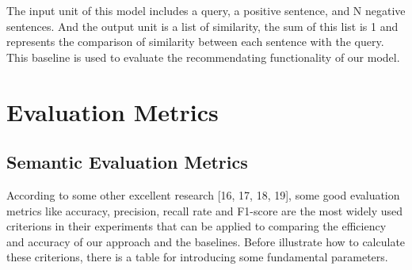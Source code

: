 The input unit of this model includes a query, a positive sentence, and N negative sentences. And the output unit is a list of similarity, the sum of this list is 1 and represents the comparison of similarity between each sentence with the query. This baseline is used to evaluate the recommendating functionality of our model.

	
	\section{Evaluation Metrics}
	
	\subsection{Semantic Evaluation Metrics}
	According to some other excellent research [16, 17, 18, 19], some good evaluation metrics like accuracy, precision, recall rate and F1-score are the most widely used criterions in their experiments that can be applied to comparing the efficiency and accuracy of our approach and the baselines. Before illustrate how to calculate these criterions, there is a table for introducing some fundamental parameters.\par
	
